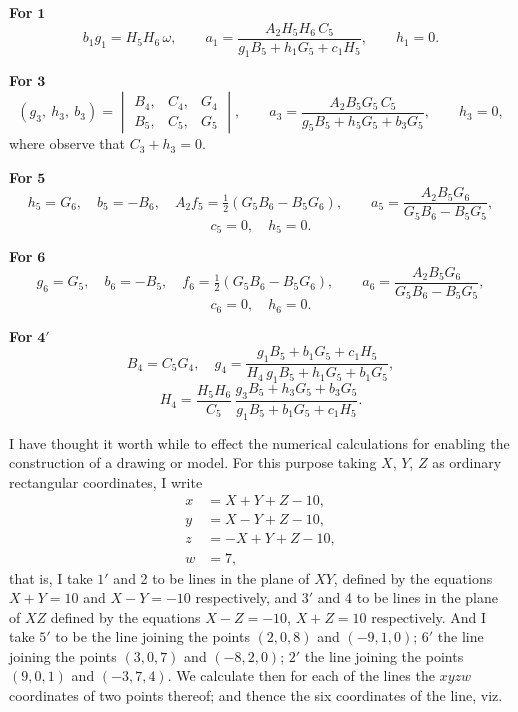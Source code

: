 \documentclass[11pt,a4paper]{article}
\begin{document}
\textbf{For} $\mathbf{1}$
\[
b_{1}g_{1} = H_{5}H_{6}\, \omega,\qquad a_{1} = \frac{A_{2}H_{5}H_{6}\, C_{5}}{g_{1}B_{5}+h_{1}G_{5}+c_{1}H_{5}},\qquad h_{1} = 0.
\]

\newpage
\setcounter{page}{325}

\textbf{For} $\mathbf{3}$
\[
(g_{3},\ h_{3},\ b_{3}) = \begin{vmatrix} B_{4}, & C_{4}, & G_{4}\\ B_{5}, & C_{5}, & G_{5}\end{vmatrix},\qquad a_{3} = \frac{A_{2}B_{5}G_{5}\, C_{5}}{g_{5}B_{5}+h_{5}G_{5}+b_{3}G_{5}},\qquad h_{3} = 0,
\]
where observe that $C_{3} + h_{3} = 0$.

\textbf{For} $\mathbf{5}$
\[
h_{5} = G_{6},\quad b_{5} = -B_{6},\quad A_{2}f_{5} = \tfrac{1}{2}(G_{5}B_{6}-B_{5}G_{6}),\qquad a_{5} = \frac{A_{2}B_{5}G_{6}}{G_{5}B_{6}-B_{5}G_{5}},
\]
\[
c_{5} = 0,\quad h_{5} = 0.
\]

\textbf{For} $\mathbf{6}$
\[
g_{6} = G_{5},\quad b_{6} = -B_{5},\quad f_{6} = \tfrac{1}{2}(G_{5}B_{6}-B_{5}G_{6}),\qquad a_{6} = \frac{A_{2}B_{5}G_{6}}{G_{5}B_{6}-B_{5}G_{5}},
\]
\[
c_{6} = 0,\quad h_{6} = 0.
\]

\textbf{For} $\mathbf{4'}$
\[
B_{4} = C_{5}G_{4},\quad g_{4} = \frac{g_{1}B_{5}+b_{1}G_{5}+c_{1}H_{5}}{H_{4}\, g_{1}B_{5}+h_{1}G_{5}+b_{1}G_{5}},
\]
\[
H_{4} = \frac{H_{5}H_{6}}{C_{5}}\, \frac{g_{3}B_{5}+h_{3}G_{5}+b_{3}G_{5}}{g_{1}B_{5}+b_{1}G_{5}+c_{1}H_{5}}.
\]

I have thought it worth while to effect the numerical calculations for enabling the construction of a drawing or model. For this purpose taking $X$, $Y$, $Z$ as ordinary rectangular coordinates, I write
\begin{align*}
x &= X + Y + Z - 10,\\
y &= X - Y + Z - 10,\\
z &= -X + Y + Z - 10,\\
w &= 7,
\end{align*}
that is, I take $1'$ and 2 to be lines in the plane of $XY$, defined by the equations $X+Y=10$ and $X-Y=-10$ respectively, and $3'$ and 4 to be lines in the plane of $XZ$ defined by the equations $X-Z=-10$, $X+Z=10$ respectively. And I take $5'$ to be the line joining the points $(2,0,8)$ and $(-9,1,0)$; $6'$ the line joining the points $(3,0,7)$ and $(-8,2,0)$; $2'$ the line joining the points $(9,0,1)$ and $(-3,7,4)$. We calculate then for each of the lines the $xyzw$ coordinates of two points thereof; and thence the six coordinates of the line, viz.
\end{document}

